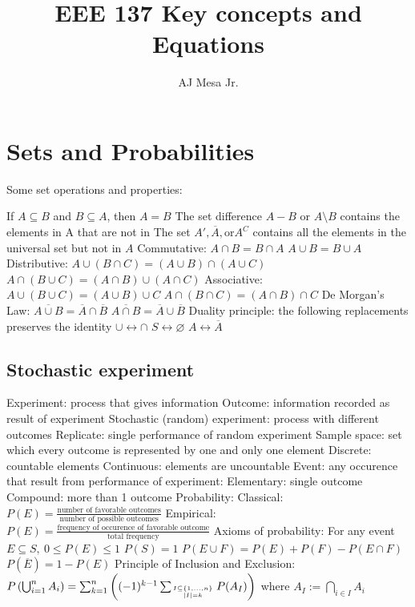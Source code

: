\documentclass[a4paper,11pt]{article}
\title{\textbf{EEE 137 Key concepts and Equations}}
\author{AJ Mesa Jr.}
\begin{document}
	\maketitle
	\section{Sets and Probabilities}
	Some set operations and properties:
	\begin{outline}[enumerate]
		\1 If $A \subseteq B$ and $B \subseteq A$, then $A = B$
		\1 The set difference $A - B$ or $A \setminus B$ contains the elements in A that are not in 
		\1 The set $A', \overline{A}, \text{or} A^C$ contains all the elements in the universal set but not in $A$ 
		\1 Commutative: 
			\2 $A \cap B = B \cap A$ 
			\2 $A \cup B = B \cup A$
		\1 Distributive: 
			\2 $A \cup \left(B \cap C\right) = \left(A \cup B\right)\cap \left(A \cup C\right)$
			\2 $A \cap \left(B \cup C\right) = \left(A \cap B\right)\cup \left(A \cap C\right)$
		\1 Associative: 
			\2 $A \cup \left(B \cup C\right) 	= \left(A \cup B\right) \cup C$
			\2 $A \cap \left(B \cap C\right) 	= \left(A \cap B\right) \cap C$
		\1 De Morgan's Law:
			\2 $\overline{A \cup B} = \overline{A} \cap \overline{B}$
			\2 $\overline{A \cap B} = \overline{A} \cup \overline{B}$	
		\1 Duality principle: the following replacements preserves the identity 
			\2 $\cup \longleftrightarrow \cap$
			\2 $S \longleftrightarrow \varnothing$	
			\2 $A \longleftrightarrow \overline{A}$
	\end{outline}
	\subsection*{Stochastic experiment}
	\begin{outline}[enumerate]
		\1 Experiment: process that gives information
		\1 Outcome: information recorded as result of experiment
		\1 Stochastic (random) experiment: process with different outcomes
		\1 Replicate: single performance of random experiment
		\1 Sample space: set which every outcome is represented by one and only one element
			\2 Discrete: countable elements
			\2 Continuous: elements are uncountable
		\1 Event: any occurence that result from performance of experiment:
			\2 Elementary: single outcome
			\2 Compound: more than 1 outcome
		\1 Probability: 
			\2 Classical: $P(E) = \frac{\text{number of favorable outcomes}}{\text{number of possible outcomes}}$
			\2 Empirical: $P(E) = \frac{\text{frequency of occurence of favorable outcome}}{\text{total frequency}}$	
		\1 Axioms of probability:
			\2 For any event $E \subseteq S,~0 \leq P(E) \leq 1$
			\2 $P(S) = 1$
			\2 $P(E \cup F) = P(E) + P(F) - P(E \cap F)$
			\2 $P(\overline{E}) = 1 - P(E)$
			\2 Principle of Inclusion and Exclusion: $P\left(\bigcup _{i=1}^{n}A_{i}\right)=\sum _{k=1}^{n}\left((-1)^{k-1}\sum _{I\subseteq \{1,\ldots ,n\} \atop |I|=k} P (A_{I})\right)$	
			\2 where $A_{I}:=\bigcap _{{i\in I}}A_{i}$
	\end{outline}
	
\end{document}
